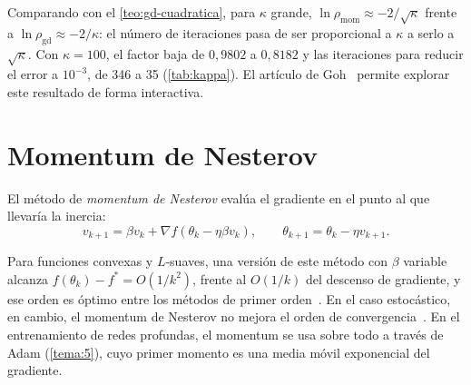 Comparando con el \cref{teo:gd-cuadratica}, para $\kappa$ grande, $\ln\rho_{\text{mom}}\approx -2/\sqrt\kappa$ frente a $\ln\rho_{\text{gd}}\approx -2/\kappa$: el número de iteraciones pasa de ser proporcional a $\kappa$ a serlo a $\sqrt\kappa$. Con $\kappa=100$, el factor baja de $0{,}9802$ a $0{,}8182$ y las iteraciones para reducir el error a $10^{-3}$, de 346 a 35 (\cref{tab:kappa}). El artículo de Goh~\cite{goh} permite explorar este resultado de forma interactiva.

\addtocounter{definicion}{1}%

\section{Momentum de Nesterov}

\begin{definicion}
El método de \emph{momentum de Nesterov} evalúa el gradiente en el punto al que llevaría la inercia:
\[
v_{k+1}=\beta v_k+\nabla f(\theta_k-\eta\beta v_k),\qquad\theta_{k+1}=\theta_k-\eta v_{k+1}.
\]
\end{definicion}

Para funciones convexas y $L$-suaves, una versión de este método con $\beta$ variable alcanza $f(\theta_k)-f^{\ast}=O(1/k^{2})$, frente al $O(1/k)$ del descenso de gradiente, y ese orden es óptimo entre los métodos de primer orden~\cite{nesterov}. En el caso estocástico, en cambio, el momentum de Nesterov no mejora el orden de convergencia~\cite[§8.3.3]{gbc}. En el entrenamiento de redes profundas, el momentum se usa sobre todo a través de Adam (\cref{tema:5}), cuyo primer momento es una media móvil exponencial del gradiente.

